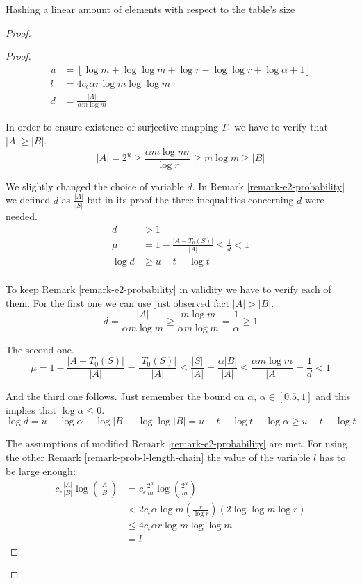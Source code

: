 \begin{section}{Hashing a linear amount of elements with respect to the table's size}
\begin{proof}
\begin{proof}
\[
\begin{split}
	u & = \left\lfloor \log m + \log \log m + \log r - \log \log r + \log \alpha + 1 \right\rfloor \\
	l & = 4 c_\epsilon \alpha r \log m \log \log m \\
	d & = \frac{|A|}{\alpha m \log m}
\end{split}
\]

In order to ensure existence of surjective mapping $T_1$ we have to verify that $|A| \geq |B|$.
\[
	|A| = 2 ^ u \geq \frac{\alpha m \log m r}{\log r} \geq m \log m \geq |B|
\]

We slightly changed the choice of variable $d$. In Remark \ref{remark-e2-probability} we defined $d$ as $\frac{|A|}{|S|}$ but in its proof the three inequalities concerning $d$ were needed.
\[
\begin{split}
	d & > 1 \\
	\mu & = 1 - \frac{|A - T_0(S)|}{|A|} \leq \frac{1}{d} < 1 \\
	\log d & \geq u - t - \log t \\
\end{split}
\]

To keep Remark \ref{remark-e2-probability} in validity we have to verify each of them. For the first one we can use just observed fact $|A| > |B|$.
\[
	d = \frac{|A|}{\alpha m \log m} \geq \frac{m \log m}{\alpha m \log m} = \frac{1}{\alpha} \geq 1
\]

The second one.
\[
	\mu = 1 - \frac{|A - T_0(S)|}{|A|} = \frac{|T_0(S)|}{|A|} \leq \frac{|S|}{|A|} = \frac{\alpha |B|}{|A|} \leq \frac{\alpha m \log m}{|A|} = \frac{1}{d} < 1
\]

And the third one follows. Just remember the bound on $\alpha$, $\alpha \in \left[0.5, 1\right]$ and this implies that $\log \alpha \leq 0$.
\[
	\log d = u - \log \alpha - \log |B| - \log \log |B| = u - t - \log t - \log \alpha \geq u - t - \log t
\]

The assumptions of modified Remark \ref{remark-e2-probability} are met. For using the other Remark \ref{remark-prob-l-length-chain} the value of the variable $l$ has to be large enough:
\[
\begin{split}
c_{\epsilon} \frac{|A|}{|B|} \log \left(\frac{|A|}{|B|}\right) 
	& = c_{\epsilon} \frac{2^u}{m} \log \left(\frac{2^u}{m}\right) \\
	& < 2 c_{\epsilon} \alpha \log m \left( \frac{r}{\log r} \right) \left(2 \log \log m \log r \right) \\
	& \leq 4 c_{\epsilon} \alpha r \log m \log \log m \\
	& = l
\end{split}
\]


\end{proof}
\end{proof}
\end{section}
